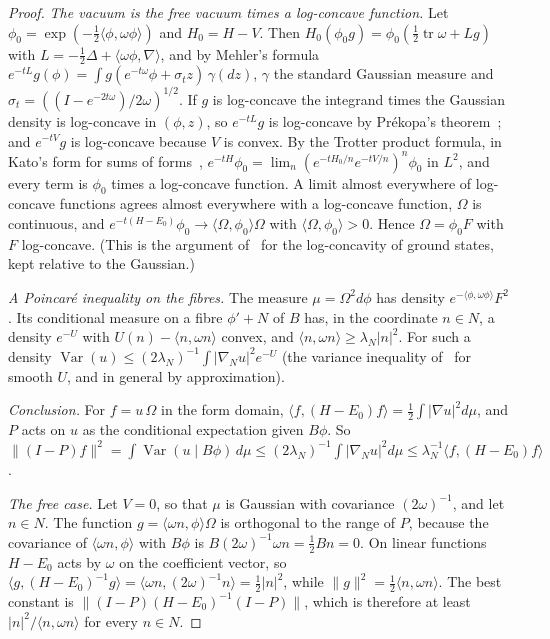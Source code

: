 \begin{proof}
\emph{The vacuum is the free vacuum times a log-concave function.} Let
$\phi_0=\exp(-\tfrac12\langle\phi,\omega\phi\rangle)$ and $H_0=H-V$. Then
$H_0(\phi_0g)=\phi_0(\tfrac12\operatorname{tr}\omega+Lg)$ with
$L=-\tfrac12\Delta+\langle\omega\phi,\nabla\rangle$, and by Mehler's formula
$e^{-tL}g(\phi)=\int g(e^{-t\omega}\phi+\sigma_tz)\,\gamma(dz)$, $\gamma$ the standard Gaussian measure and
$\sigma_t=((I-e^{-2t\omega})/2\omega)^{1/2}$. If $g$ is log-concave the integrand times the Gaussian density
is log-concave in $(\phi,z)$, so $e^{-tL}g$ is log-concave by Pr\'ekopa's theorem~\cite{BL76}; and
$e^{-tV}g$ is log-concave because $V$ is convex. By the Trotter product formula, in Kato's form for sums of forms~\cite{Ka78},
$e^{-tH}\phi_0=\lim_n(e^{-tH_0/n}e^{-tV/n})^n\phi_0$ in $L^2$, and every term is $\phi_0$ times a log-concave
function. A limit almost everywhere of log-concave functions agrees almost everywhere with a log-concave
function, $\Omega$ is continuous, and
$e^{-t(H-E_0)}\phi_0\to\langle\Omega,\phi_0\rangle\Omega$ with $\langle\Omega,\phi_0\rangle>0$. Hence
$\Omega=\phi_0F$ with $F$ log-concave. (This is the argument of~\cite{BL76} for the log-concavity of ground
states, kept relative to the Gaussian.)

\emph{A Poincar\'e inequality on the fibres.} The measure $\mu=\Omega^2d\phi$ has density
$e^{-\langle\phi,\omega\phi\rangle}F^2$. Its conditional measure on a fibre $\phi'+N$ of $B$ has, in the
coordinate $n\in N$, a density $e^{-U}$ with $U(n)-\langle n,\omega n\rangle$ convex, and
$\langle n,\omega n\rangle\ge\lambda_N|n|^2$. For such a density
$\operatorname{Var}(u)\le(2\lambda_N)^{-1}\int|\nabla_Nu|^2e^{-U}$ (the variance inequality
of~\cite{BL76} for smooth $U$, and in general by approximation).

\emph{Conclusion.} For $f=u\,\Omega$ in the form domain,
$\langle f,(H-E_0)f\rangle=\tfrac12\int|\nabla u|^2d\mu$, and $P$ acts on $u$ as the conditional
expectation given $B\phi$. So
$\|(I-P)f\|^2=\int\operatorname{Var}(u\mid B\phi)\,d\mu\le(2\lambda_N)^{-1}\int|\nabla_Nu|^2d\mu
\le\lambda_N^{-1}\langle f,(H-E_0)f\rangle$.

\emph{The free case.} Let $V=0$, so that $\mu$ is Gaussian with covariance $(2\omega)^{-1}$, and let
$n\in N$. The function $g=\langle\omega n,\phi\rangle\Omega$ is orthogonal to the range of $P$, because the
covariance of $\langle\omega n,\phi\rangle$ with $B\phi$ is $B(2\omega)^{-1}\omega n=\tfrac12Bn=0$. On linear
functions $H-E_0$ acts by $\omega$ on the coefficient vector, so
$\langle g,(H-E_0)^{-1}g\rangle=\langle\omega n,(2\omega)^{-1}n\rangle=\tfrac12|n|^2$, while
$\|g\|^2=\tfrac12\langle n,\omega n\rangle$. The best constant is $\|(I-P)(H-E_0)^{-1}(I-P)\|$, which is
therefore at least $|n|^2/\langle n,\omega n\rangle$ for every $n\in N$.


\end{proof}

